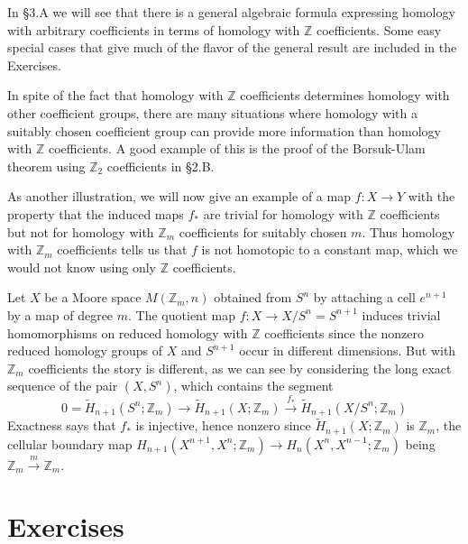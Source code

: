 In \S3.A we will see that there is a general algebraic formula expressing homology with arbitrary coefficients in terms of homology with $\mathbb{Z}$ coefficients. Some easy special cases that give much of the flavor of the general result are included in the Exercises.

In spite of the fact that homology with $\mathbb{Z}$ coefficients determines homology with other coefficient groups, there are many situations where homology with a suitably chosen coefficient group can provide more information than homology with $\mathbb{Z}$ coefficients. A good example of this is the proof of the Borsuk-Ulam theorem using $\mathbb{Z}_2$ coefficients in \S2.B.

As another illustration, we will now give an example of a map $f: X \to Y$ with the property that the induced maps $f_*$ are trivial for homology with $\mathbb{Z}$ coefficients but not for homology with $\mathbb{Z}_m$ coefficients for suitably chosen $m$. Thus homology with $\mathbb{Z}_m$ coefficients tells us that $f$ is not homotopic to a constant map, which we would not know using only $\mathbb{Z}$ coefficients.

\begin{example}
\label{ex:homology-moore-space-quotient}
Let $X$ be a Moore space $M(\mathbb{Z}_m, n)$ obtained from $S^n$ by attaching a cell $e^{n+1}$ by a map of degree $m$. The quotient map $f:X \to X/S^n = S^{n+1}$ induces trivial homomorphisms on reduced homology with $\mathbb{Z}$ coefficients since the nonzero reduced homology groups of $X$ and $S^{n+1}$ occur in different dimensions. But with $\mathbb{Z}_m$ coefficients the story is different, as we can see by considering the long exact sequence of the pair $(X, S^n)$, which contains the segment
\[
0 = \widetilde{H}_{n+1}(S^n;\mathbb{Z}_m) \to \widetilde{H}_{n+1}(X;\mathbb{Z}_m) \xrightarrow{f_*} \widetilde{H}_{n+1}(X/S^n;\mathbb{Z}_m)
\]
Exactness says that $f_*$ is injective, hence nonzero since $\widetilde{H}_{n+1}(X;\mathbb{Z}_m)$ is $\mathbb{Z}_m$, the cellular boundary map $H_{n+1}(X^{n+1}, X^n;\mathbb{Z}_m) \to H_n(X^n, X^{n-1};\mathbb{Z}_m)$ being $\mathbb{Z}_m \xrightarrow{m} \mathbb{Z}_m$.
\end{example}

\section*{Exercises}

